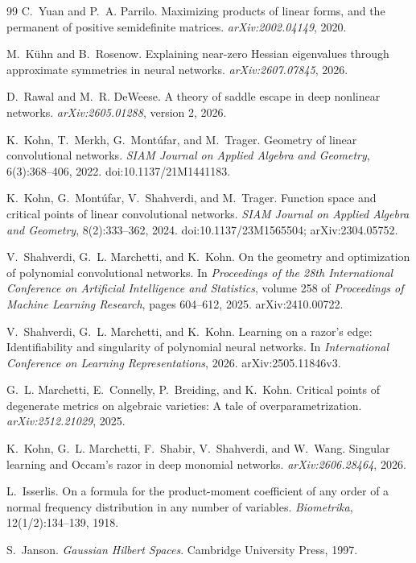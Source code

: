 \documentclass[11pt]{article}
\begin{document}
\begin{thebibliography}{99}
C.~Yuan and P.~A. Parrilo.
\newblock Maximizing products of linear forms, and the permanent of positive semidefinite matrices.
\newblock \emph{arXiv:2002.04149}, 2020.

M.~K\"uhn and B.~Rosenow.
\newblock Explaining near-zero Hessian eigenvalues through approximate symmetries in neural networks.
\newblock \emph{arXiv:2607.07845}, 2026.

D.~Rawal and M.~R. DeWeese.
\newblock A theory of saddle escape in deep nonlinear networks.
\newblock \emph{arXiv:2605.01288}, version 2, 2026.

K.~Kohn, T.~Merkh, G.~Mont\'ufar, and M.~Trager.
\newblock Geometry of linear convolutional networks.
\newblock \emph{SIAM Journal on Applied Algebra and Geometry}, 6(3):368--406, 2022.
\newblock doi:10.1137/21M1441183.

K.~Kohn, G.~Mont\'ufar, V.~Shahverdi, and M.~Trager.
\newblock Function space and critical points of linear convolutional networks.
\newblock \emph{SIAM Journal on Applied Algebra and Geometry}, 8(2):333--362, 2024.
\newblock doi:10.1137/23M1565504; arXiv:2304.05752.

V.~Shahverdi, G.~L. Marchetti, and K.~Kohn.
\newblock On the geometry and optimization of polynomial convolutional networks.
\newblock In \emph{Proceedings of the 28th International Conference on Artificial Intelligence and Statistics}, volume 258 of \emph{Proceedings of Machine Learning Research}, pages 604--612, 2025.
\newblock arXiv:2410.00722.

V.~Shahverdi, G.~L. Marchetti, and K.~Kohn.
\newblock Learning on a razor's edge: Identifiability and singularity of polynomial neural networks.
\newblock In \emph{International Conference on Learning Representations}, 2026.
\newblock arXiv:2505.11846v3.

G.~L. Marchetti, E.~Connelly, P.~Breiding, and K.~Kohn.
\newblock Critical points of degenerate metrics on algebraic varieties: A tale of overparametrization.
\newblock \emph{arXiv:2512.21029}, 2025.

K.~Kohn, G.~L. Marchetti, F.~Shabir, V.~Shahverdi, and W.~Wang.
\newblock Singular learning and Occam's razor in deep monomial networks.
\newblock \emph{arXiv:2606.28464}, 2026.

L.~Isserlis.
\newblock On a formula for the product-moment coefficient of any order of a normal frequency distribution in any number of variables.
\newblock \emph{Biometrika}, 12(1/2):134--139, 1918.

S.~Janson.
\newblock \emph{Gaussian Hilbert Spaces}.
\newblock Cambridge University Press, 1997.

\end{thebibliography}
\end{document}
